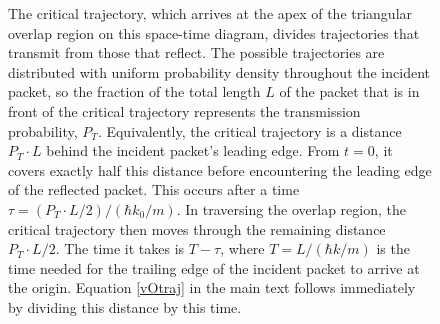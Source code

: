 \documentclass[aps,prc,twocolumn,letterpaper,floatfix]{revtex4}
\begin{document}
\begin{figure}[t]
\begin{center}
\caption{
The critical trajectory, which arrives at the apex of the triangular overlap
region on this space-time diagram, 
divides trajectories that transmit from those that reflect.
The possible trajectories are distributed with uniform
probability density throughout the incident packet, so the fraction of
the total length $L$ of the packet that is in front of the critical
trajectory represents the transmission probability, $P_T$.
Equivalently, the critical trajectory is a distance $P_T\cdot L$ behind
the incident packet's leading edge.  From $t=0$, it covers exactly
half this distance before encountering the leading edge of the
reflected packet.  This occurs after a time $\tau = (P_T\cdot L /
2)/(\hbar k_0 / m)$.  In traversing the overlap region, the critical
trajectory then moves through the remaining distance $P_T \cdot L / 2$.
The time it takes is $T - \tau$, where $T = L/(\hbar k / m)$ is the
time needed for the trailing edge of the incident packet to arrive at
the origin.  Equation \eqref{vOtraj} in the main text follows
immediately by dividing this distance by this time.  
\label{fig3}
}
\end{center}
\end{figure}
\end{document}
